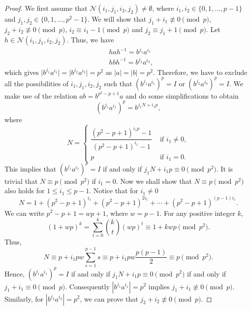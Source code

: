 \documentclass[11pt]{amsart}
\theoremstyle{plain}
\numberwithin{equation}{section}
\begin{document}
\begin{proof}
We first assume that $\mathcal{N}(i_1,j_1,i_2,j_2) \neq \emptyset$, where $i_1,i_2 \in \{0,1,\ldots,p-1\}$ and $j_1,j_2 \in \{0,1,\ldots,p^{2}-1\}$. We will show that $ j_1+i_1 \not \equiv  0  \pmod  p$, $j_2+i_2 \not \equiv  0 \pmod  p$, $i_2\equiv i_1-1 \pmod  p$ and $j_2 \equiv j_1+1 \pmod  p$. Let $h \in \mathcal{N}(i_1,j_1,i_2,j_2)$. Thus, we have 
\begin{equation}\label{s41}
\begin{split}
&hah^{-1}=b^{j_1}a^{i_1}\\
&hbh^{-1}=b^{j_2}a^{i_2},
\end{split}
\end{equation}
which gives $\mid b^{j_1}a^{i_1}\mid =\mid b^{j_2}a^{i_2}\mid =p^2$ as $|a|=|b|=p^2$. Therefore, we have to exclude all the possibilities of $i_1,j_1,i_2,j_2$ such that $(b^{j_1}a^{i_1})^p=I$ or $(b^{j_2}a^{i_2})^p=I$. We make use of the relation $ab=b^{p^2-p+1}a$ and do some simplifications to obtain 
\[
(b^{j_1}a^{i_1})^p=b^{j_1N+i_1p},
\]
where 
$$
N=\begin{cases} \dfrac{(p^2-p+1)^{i_1p}-1}{(p^2-p+1)^{i_1}-1} & \text{ if } i_1 \neq 0,\\p 
 & \text{ if } i_1=0.\end{cases}$$
This implies that  $(b^{j_1}a^{i_1})^p=I$ if and only if $j_1N+i_1p \equiv 0 \pmod {p^2}$.
 It is trivial that $N \equiv p \pmod {p^2}$ if $i_1=0$. Now we shall show that $N \equiv p \pmod {p^2}$ also holds for $1 \leq i_1 \leq p-1$.  Notice that for $i_1 \neq 0$ 
\[
N=1+(p^2-p+1)^{i_1}+(p^2-p+1)^{2i_1}+\cdots+(p^2-p+1)^{(p-1)i_1}.
\]
We can write $p^2-p+1=wp+1$, where $w=p-1$. For any positive integer $k$, $$(1+wp)^k=\displaystyle \sum_{t=0}^{k}  \binom{k}{t} (wp)^t \equiv 1+kwp \pmod {p^2}.$$Thus, 
\[
N \equiv \displaystyle p+i_1pw\sum_{s=1}^{p-1}s \equiv p+i_1pw \frac{p(p-1)}{2} \equiv p \pmod {p^2}.
\]
 Hence,  $(b^{j_1}a^{i_1})^p=I$ if and only if $j_1N+i_1p \equiv 0 \pmod {p^2}$ if and only if $j_1+i_1 \equiv 0 \pmod p$. Consequently $|b^{j_1}a^{i_1}|=p^2$ implies $j_1+i_1 \not \equiv 0 \pmod  p$. Similarly, for $|b^{j_2}a^{i_2}|=p^2$, we can prove that $j_2+i_2 \not \equiv 0 \pmod  p$.


\end{proof}
\end{document}
